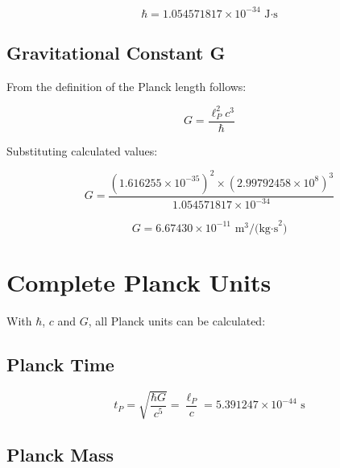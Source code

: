 	\begin{tcolorbox}[colback=green!5!white,colframe=green!75!black,title=Reduced Planck Constant]
		\begin{equation}
			\boxed{\hbar = 1.054571817 \times 10^{-34} \text{ J·s}}
		\end{equation}
	\end{tcolorbox}
	
	\subsection{Gravitational Constant G}
	
	From the definition of the Planck length follows:
	
	\begin{equation}
		G = \frac{\ell_P^2 c^3}{\hbar}
	\end{equation}
	
	Substituting calculated values:
	
	\begin{equation}
		G = \frac{(1.616255 \times 10^{-35})^2 \times (2.99792458 \times 10^8)^3}{1.054571817 \times 10^{-34}}
	\end{equation}
	
	\begin{tcolorbox}[colback=green!5!white,colframe=green!75!black,title=Gravitational Constant]
		\begin{equation}
			\boxed{G = 6.67430 \times 10^{-11} \text{ m}^3\text{/(kg·s}^2\text{)}}
		\end{equation}
	\end{tcolorbox}
	
	\section{Complete Planck Units}
	
	With $\hbar$, $c$ and $G$, all Planck units can be calculated:
	
	\subsection{Planck Time}
	
	\begin{equation}
		t_P = \sqrt{\frac{\hbar G}{c^5}} = \frac{\ell_P}{c} = 5.391247 \times 10^{-44} \text{ s}
	\end{equation}
	
	\subsection{Planck Mass}
	
